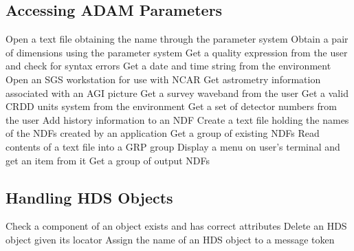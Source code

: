 \subsection {Accessing ADAM Parameters}
\label{APP:ADAM}
  {Open a text file obtaining the name through the parameter system}
  {Obtain a pair of dimensions using the parameter system}
  {Get a quality expression from the user and check for syntax errors}
  {Get a date and time string from the environment}
  {Open an SGS workstation for use with NCAR}
  {Get astrometry information associated with an AGI picture}
  {Get a survey waveband from the user}
  {Get a valid CRDD units system from the environment}
  {Get a set of detector numbers from the user}
  {Add history information to an NDF}
  {Create a text file holding the names of the NDFs created by an application}
  {Get a group of existing NDFs}
  {Read contents of a text file into a GRP group}
  {Display a menu on user's terminal and get an item from it}
  {Get a group of output NDFs}


\subsection {Handling HDS Objects}
  {Check a component of an object exists and has correct attributes}
  {Delete an HDS object given its locator}
  {Assign the name of an HDS object to a message token}


